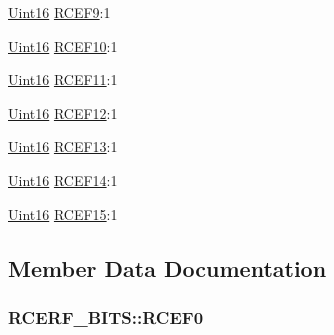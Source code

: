 \begin{DoxyCompactItemize}
\item 
\hyperlink{_d_s_p2833x___device_8h_a59a9f6be4562c327cbfb4f7e8e18f08b}{Uint16} \hyperlink{struct_r_c_e_r_f___b_i_t_s_a343287edaa323b8a98524b000345bfd3}{R\+C\+E\+F9}\+:1
\item 
\hyperlink{_d_s_p2833x___device_8h_a59a9f6be4562c327cbfb4f7e8e18f08b}{Uint16} \hyperlink{struct_r_c_e_r_f___b_i_t_s_a4e9ccc889f8d602d4a6a1bb3cc98ab73}{R\+C\+E\+F10}\+:1
\item 
\hyperlink{_d_s_p2833x___device_8h_a59a9f6be4562c327cbfb4f7e8e18f08b}{Uint16} \hyperlink{struct_r_c_e_r_f___b_i_t_s_afd5d0dcd8d903e1294381e8488bbac83}{R\+C\+E\+F11}\+:1
\item 
\hyperlink{_d_s_p2833x___device_8h_a59a9f6be4562c327cbfb4f7e8e18f08b}{Uint16} \hyperlink{struct_r_c_e_r_f___b_i_t_s_a89f425db2dd1acd9cd9699fc2363f6fb}{R\+C\+E\+F12}\+:1
\item 
\hyperlink{_d_s_p2833x___device_8h_a59a9f6be4562c327cbfb4f7e8e18f08b}{Uint16} \hyperlink{struct_r_c_e_r_f___b_i_t_s_afb046e3988d58ba8187cfb1f5652e7c8}{R\+C\+E\+F13}\+:1
\item 
\hyperlink{_d_s_p2833x___device_8h_a59a9f6be4562c327cbfb4f7e8e18f08b}{Uint16} \hyperlink{struct_r_c_e_r_f___b_i_t_s_a168ef8c3d05b32f16425fdc544654ed1}{R\+C\+E\+F14}\+:1
\item 
\hyperlink{_d_s_p2833x___device_8h_a59a9f6be4562c327cbfb4f7e8e18f08b}{Uint16} \hyperlink{struct_r_c_e_r_f___b_i_t_s_a55da21bf7b6d48ae6fea59d214b25369}{R\+C\+E\+F15}\+:1
\end{DoxyCompactItemize}


\subsection{Member Data Documentation}
\hypertarget{struct_r_c_e_r_f___b_i_t_s_acc67a2372e717f6cf51aca88b687a3e7}{}
\subsubsection[{R\+C\+E\+F0}]{ R\+C\+E\+R\+F\+\_\+\+B\+I\+T\+S\+::\+R\+C\+E\+F0}\label{struct_r_c_e_r_f___b_i_t_s_acc67a2372e717f6cf51aca88b687a3e7}
\hypertarget{struct_r_c_e_r_f___b_i_t_s_ae24d7604f56945af0ecab3d46cc7fd08}{}

